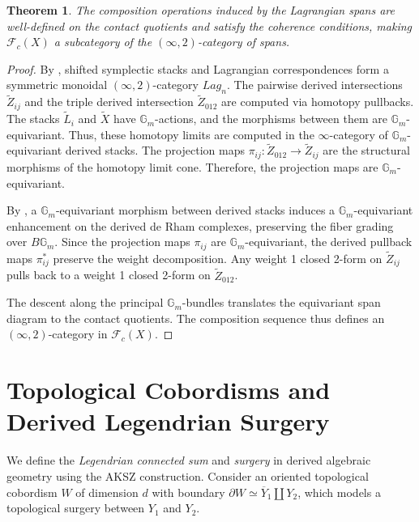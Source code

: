 \documentclass[reqno]{amsart}
\newcommand{\Gm}{\mathbb{G}_m}
\newtheorem{theorem}{Theorem}[section]
\begin{document}
\begin{theorem}\label{thm:span}
The composition operations induced by the Lagrangian spans are well-defined on the contact quotients and satisfy the coherence conditions, making $\mathcal{F}_{c}(X)$ a subcategory of the $(\infty, 2)$-category of spans.
\end{theorem}
\begin{proof}
By \cite[Section 2]{CHS}, shifted symplectic stacks and Lagrangian correspondences form a symmetric monoidal $(\infty, 2)$-category $Lag_{n}$. The pairwise derived intersections $\widetilde{Z}_{ij}$ and the triple derived intersection $\widetilde{Z}_{012}$ are computed via homotopy pullbacks. The stacks $\widetilde{L}_i$ and $\widetilde{X}$ have $\Gm$-actions, and the morphisms between them are $\Gm$-equivariant. Thus, these homotopy limits are computed in the $\infty$-category of $\Gm$-equivariant derived stacks. The projection maps $\pi_{ij} \colon \widetilde{Z}_{012} \to \widetilde{Z}_{ij}$ are the structural morphisms of the homotopy limit cone. Therefore, the projection maps are $\Gm$-equivariant.

By \cite[Section 2.1.1]{Calaque}, a $\Gm$-equivariant morphism between derived stacks induces a $\Gm$-equivariant enhancement on the derived de Rham complexes, preserving the fiber grading over $B\Gm$. Since the projection maps $\pi_{ij}$ are $\Gm$-equivariant, the derived pullback maps $\pi_{ij}^*$ preserve the weight decomposition. Any weight 1 closed 2-form on $\widetilde{Z}_{ij}$ pulls back to a weight 1 closed 2-form on $\widetilde{Z}_{012}$.

The descent along the principal $\Gm$-bundles translates the equivariant span diagram to the contact quotients. The composition sequence thus defines an $(\infty, 2)$-category in $\mathcal{F}_{c}(X)$.

\end{proof}

\section{Topological Cobordisms and Derived Legendrian Surgery}\label{sec:cobordisms}

We define the \textit{Legendrian connected sum} and \textit{surgery} in derived algebraic geometry using the AKSZ construction. 
Consider an oriented topological cobordism $W$ of dimension $d$ with boundary $\partial W \simeq \overline{Y}_{1} \amalg Y_{2}$, which models a topological surgery between $Y_1$ and $Y_2$.
\end{document}
